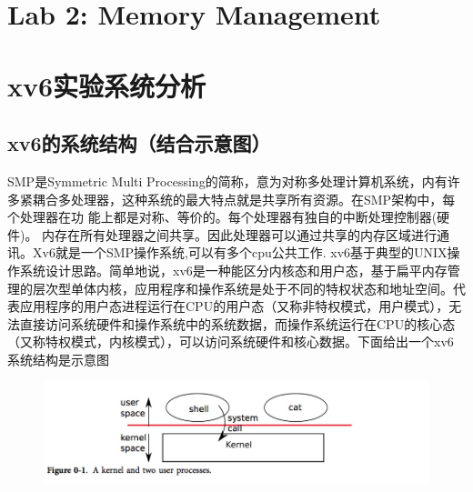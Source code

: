 \documentclass[a4paper,12pt]{report}
\begin{document}
\chapter{ Lab 2: Memory Management}
\chapter{xv6实验系统分析}
\section{xv6的系统结构（结合示意图）}

SMP是Symmetric Multi Processing的简称，意为对称多处理计算机系统，内有许多紧耦合多处理器，这种系统的最大特点就是共享所有资源。在SMP架构中，每个处理器在功 能上都是对称、等价的。每个处理器有独自的中断处理控制器(硬件)。 内存在所有处理器之间共享。因此处理器可以通过共享的内存区域进行通讯。Xv6就是一个SMP操作系统,可以有多个cpu公共工作.
xv6基于典型的UNIX操作系统设计思路。简单地说，xv6是一种能区分内核态和用户态，基于扁平内存管理的层次型单体内核，应用程序和操作系统是处于不同的特权状态和地址空间。代表应用程序的用户态进程运行在CPU的用户态（又称非特权模式，用户模式），无法直接访问系统硬件和操作系统中的系统数据，而操作系统运行在CPU的核心态（又称特权模式，内核模式），可以访问系统硬件和核心数据。下面给出一个xv6系统结构是示意图
\begin{figure}[H]
	\centering
	\includegraphics [width=1.0\textwidth]{figure//4.1.png}
\end{figure}
\end{document}
